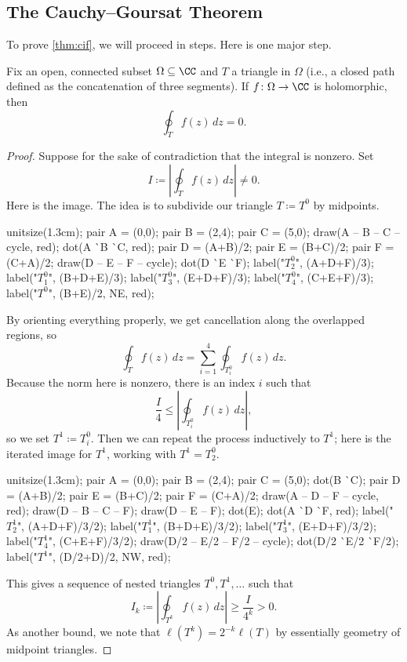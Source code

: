 \documentclass[../notes.tex]{subfiles}
\begin{document}
\subsection{The Cauchy--Goursat Theorem}
To prove \autoref{thm:cif}, we will proceed in steps. Here is one major step.
\begin{theorem} \label{thm:cg}
	Fix an open, connected subset $\Omega\subseteq\CC$ and $T$ a triangle in $\Omega$ (i.e., a closed path defined as the concatenation of three segments). If $f\colon \Omega\to\CC$ is holomorphic, then
	\[\oint_Tf(z)\,dz=0.\]
\end{theorem}
\begin{proof}
	Suppose for the sake of contradiction that the integral is nonzero. Set
	\[I\coloneqq \left|\oint_Tf(z)\,dz\right|\ne0.\]
	Here is the image. The idea is to subdivide our triangle $T\coloneqq T^0$ by midpoints.
	\begin{center}
		\begin{asy}
			unitsize(1.3cm);
			pair A = (0,0);
			pair B = (2,4);
			pair C = (5,0);
			draw(A -- B -- C -- cycle, red);
			dot(A ^^ B ^^ C, red);
			pair D = (A+B)/2;
			pair E = (B+C)/2;
			pair F = (C+A)/2;
			draw(D -- E -- F -- cycle);
			dot(D ^^ E ^^ F);
			label("$T_2^0$", (A+D+F)/3);
			label("$T_1^0$", (B+D+E)/3);
			label("$T_3^0$", (E+D+F)/3);
			label("$T_4^0$", (C+E+F)/3);
			label("$T^0$", (B+E)/2, NE, red);
		\end{asy}
	\end{center}
	By orienting everything properly, we get cancellation along the overlapped regions, so
	\[\oint_Tf(z)\,dz=\sum_{i=1}^4\oint_{T^0_i}f(z)\,dz.\]
	Because the norm here is nonzero, there is an index $i$ such that
	\[\frac I4\le\left|\oint_{T^0_i}f(z)\,dz\right|,\]
	so we set $T^1\coloneqq T^0_i$. Then we can repeat the process inductively to $T^1$; here is the iterated image for $T^1$, working with $T^1=T^0_2$.
	\begin{center}
		\begin{asy}
			unitsize(1.3cm);
			pair A = (0,0);
			pair B = (2,4);
			pair C = (5,0);
			dot(B ^^ C);
			pair D = (A+B)/2;
			pair E = (B+C)/2;
			pair F = (C+A)/2;
			draw(A -- D -- F -- cycle, red);
			draw(D -- B -- C -- F);
			draw(D -- E -- F);
			dot(E); dot(A ^^ D ^^ F, red);
			label("$T_2^1$", (A+D+F)/3/2);
			label("$T_1^1$", (B+D+E)/3/2);
			label("$T_3^1$", (E+D+F)/3/2);
			label("$T_4^1$", (C+E+F)/3/2);
			draw(D/2 -- E/2 -- F/2 -- cycle);
			dot(D/2 ^^ E/2 ^^ F/2);
			label("$T^1$", (D/2+D)/2, NW, red);
		\end{asy}
	\end{center}
	This gives a sequence of nested triangles $T^0,T^1,\ldots$ such that
	\[I_k\coloneqq \left|\oint_{T^k}f(z)\,dz\right|\ge\frac I{4^k}>0.\]
	As another bound, we note that $\ell\left(T^k\right)=2^{-k}\ell(T)$ by essentially geometry of midpoint triangles.


\end{proof}
\end{document}
